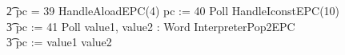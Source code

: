 \begin{figure}[t]
\begin{circus}
    \t2 {} \circelse pc = 39 \circthen HandleAloadEPC(4) \circseq pc := 40 \circseq Poll \circseq HandleIconstEPC(10) \circseq \\
    \t3 pc := 41 \circseq Poll \circseq \circvar value1, value2 : Word \circspot InterpreterPop2EPC \circseq \\
    \t3 pc := \IF value1 \leq value2   \\

\end{circus}
\end{figure}
